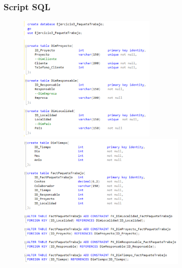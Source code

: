 \documentclass[12pt,letterpaper]{article}
\begin{document}
\subsubsection{\textbf{Script SQL }}

	\begin{figure}[htb]
		\begin{center}
			\includegraphics[width=6.5cm]{./Imagenes/Ejercicio3_script1}
			\includegraphics[width=8cm]{./Imagenes/Ejercicio3_script2}
		\end{center}
	\end{figure}
\end{document}
